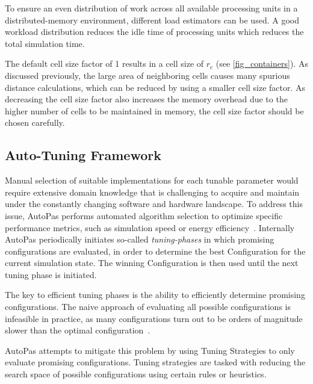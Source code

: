 \documentclass[conference]{IEEEtran}
\begin{document}
\begin{description}[style=nextline]
    \item[Load Estimator]
        To ensure an even distribution of work across all available processing units in a distributed-memory environment, different load estimators can be used. A good workload distribution reduces the idle time of processing units which reduces the total simulation time.

    \item[Cell Size Factor]
        The default cell size factor of 1 results in a cell size of $r_c$ (see \autoref{fig_containers}). As discussed previously, the large area of neighboring cells causes many spurious distance calculations, which can be reduced by using a smaller cell size factor. As decreasing the cell size factor also increases the memory overhead due to the higher number of cells to be maintained in memory\cite{Papula2020}, the cell size factor should be chosen carefully.
\end{description}


\subsection{Auto-Tuning Framework}

Manual selection of suitable implementations for each tunable parameter would require extensive domain knowledge that is challenging to acquire and maintain under the constantly changing software and hardware landscape. To address this issue, AutoPas performs automated algorithm selection to optimize specific performance metrics, such as simulation speed or energy efficiency~\cite{Gratl2022AutoPas}. Internally AutoPas periodically initiates so-called \textit{tuning-phases} in which promising configurations are evaluated, in order to determine the best Configuration for the current simulation state. The winning Configuration is then used until the next tuning phase is initiated.

The key to efficient tuning phases is the ability to efficiently determine promising configurations. The naive approach of evaluating all possible configurations is infeasible in practice, as many configurations turn out to be orders of magnitude slower than the optimal configuration~\cite{endreport.pdf}\cite{Manuel_Lerchner_Thesis.pdf}.

AutoPas attempts to mitigate this problem by using Tuning Strategies to only evaluate promising configurations. Tuning strategies are tasked with reducing the search space of possible configurations using certain rules or heuristics.
\end{document}
